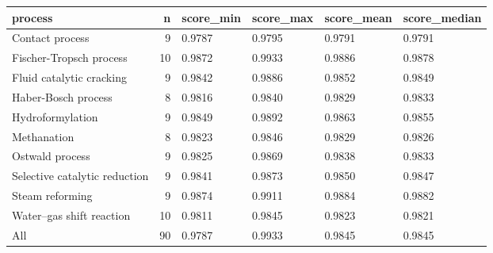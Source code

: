 \begin{tabular}{lrllll}
\toprule
process & n & score\_min & score\_max & score\_mean & score\_median \\
\midrule
Contact process & 9 & 0.9787 & 0.9795 & 0.9791 & 0.9791 \\
Fischer-Tropsch process & 10 & 0.9872 & 0.9933 & 0.9886 & 0.9878 \\
Fluid catalytic cracking & 9 & 0.9842 & 0.9886 & 0.9852 & 0.9849 \\
Haber-Bosch process & 8 & 0.9816 & 0.9840 & 0.9829 & 0.9833 \\
Hydroformylation & 9 & 0.9849 & 0.9892 & 0.9863 & 0.9855 \\
Methanation & 8 & 0.9823 & 0.9846 & 0.9829 & 0.9826 \\
Ostwald process & 9 & 0.9825 & 0.9869 & 0.9838 & 0.9833 \\
Selective catalytic reduction & 9 & 0.9841 & 0.9873 & 0.9850 & 0.9847 \\
Steam reforming & 9 & 0.9874 & 0.9911 & 0.9884 & 0.9882 \\
Water–gas shift reaction & 10 & 0.9811 & 0.9845 & 0.9823 & 0.9821 \\
All & 90 & 0.9787 & 0.9933 & 0.9845 & 0.9845 \\
\bottomrule
\end{tabular}
